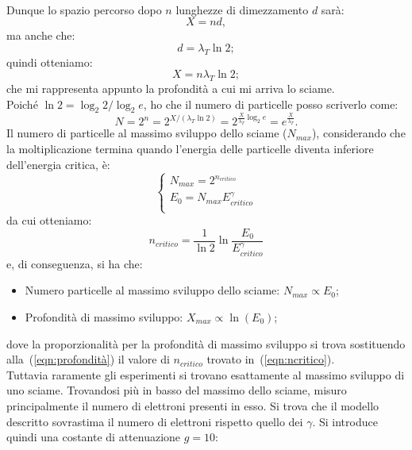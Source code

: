 \documentclass[10pt,a4paper,usenatbib]{article}
\begin{document}
\\Dunque lo spazio percorso dopo $n$ lunghezze di dimezzamento $d$ sarà: 
\begin{equation}
X = n d, 
\end{equation}
ma anche che:
\begin{equation}
 d = \lambda_T \ln{2}; 
\end{equation}
quindi otteniamo: 
\begin{equation}
 X = n \lambda_T \ln{2}; 
\label{eqn:profondità}
\end{equation}
che mi rappresenta appunto la profondità a cui mi arriva lo sciame. 
\\Poiché $\ln2 = \log_2{2}/\log_2{e}$, ho che il numero di particelle posso scriverlo come: 
\begin{equation}
 N = 2^n = 2^{X/(\lambda_T \ln2)} =  2^{\frac{X}{\lambda_T} \log_2{e}} = e^{\frac{X}{\lambda_T}}. 
\end{equation}
Il numero di particelle al massimo sviluppo dello sciame ($N_{max}$), considerando che la moltiplicazione termina quando l'energia delle particelle diventa inferiore dell'energia critica, è: 
\begin{equation}
\begin{cases}
N_{max} = 2^{n_{critico}} \\
E_0 = N_{max} E_{critico}^\gamma \\
\end{cases}
\end{equation}
da cui otteniamo: 
\begin{equation}
n_{critico} = \frac{1}{\ln2} \ln{\frac{E_0}{E_{critico}^\gamma}} 
\label{eqn:ncritico}
\end{equation}
e, di conseguenza, si ha che: 
\begin{itemize} 
\item Numero particelle al massimo sviluppo dello sciame: $N_{max} \propto E_0$; 
\item  Profondità di massimo sviluppo: $X_{max} \propto \ln(E_0)$; 
\end{itemize}
dove la proporzionalità per la profondità di massimo sviluppo si trova sostituendo alla~(\ref{eqn:profondità}) il valore di $n_{critico}$ trovato in~(\ref{eqn:ncritico}). 
\\Tuttavia raramente gli esperimenti si trovano esattamente al massimo sviluppo di uno sciame. Trovandosi più in basso del massimo dello sciame, misuro principalmente il numero di elettroni presenti in esso. Si trova che il modello descritto sovrastima il numero di elettroni rispetto quello dei $\gamma$. Si introduce quindi una costante di attenuazione $g=10$: 
\end{document}
